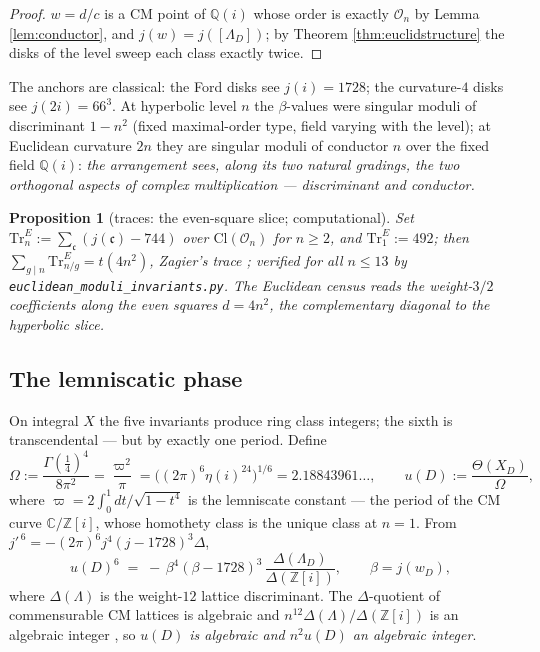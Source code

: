 \documentclass[11pt]{amsart}
\numberwithin{equation}{section}
\theoremstyle{plain}
\newtheorem{proposition}[theorem]{Proposition}
\theoremstyle{definition}
\theoremstyle{remark}
\newcommand{\C}{\mathbb{C}}
\newcommand{\Q}{\mathbb{Q}}
\newcommand{\Z}{\mathbb{Z}}
\newcommand{\Zi}{\Z[i]}
\newcommand{\Cl}{\mathrm{Cl}}
\newcommand{\idealc}{\mathfrak{c}}
\begin{document}
\begin{proof}
$w = d/c$ is a CM point of $\Q(i)$ whose order is exactly
$\mathcal{O}_n$ by Lemma \ref{lem:conductor}, and $j(w) =
j([\Lambda_D])$; by Theorem \ref{thm:euclidstructure} the disks of the
level sweep each class exactly twice.
\end{proof}

The anchors are classical: the Ford disks see $j(i) = 1728$; the
curvature-$4$ disks see $j(2i) = 66^3$.  At hyperbolic level $n$ the
$\beta$-values were singular moduli of discriminant $1 - n^2$ (fixed
maximal-order type, field varying with the level); at Euclidean
curvature $2n$ they are singular moduli of conductor $n$ over the
fixed field $\Q(i)$: \emph{the arrangement sees, along its two natural
gradings, the two orthogonal aspects of complex multiplication ---
discriminant and conductor.}

\begin{proposition}[traces: the even-square slice; computational]
\label{prop:euctraces}
Set $\mathrm{Tr}^E_n := \sum_{\idealc}(j(\idealc) - 744)$ over
$\Cl(\mathcal{O}_n)$ for $n \ge 2$, and $\mathrm{Tr}^E_1 := 492$; then
$\sum_{g \mid n}\mathrm{Tr}^E_{n/g} = t(4n^2)$, Zagier's trace
\cite{Zagier2002}; verified for all
$n \le 13$ by \texttt{euclidean\_\allowbreak moduli\_\allowbreak invariants.py}.  The Euclidean
census reads the weight-$3/2$ coefficients along the even squares
$d = 4n^2$, the complementary diagonal to the hyperbolic slice.
\end{proposition}

\subsection{The lemniscatic phase}\label{subsec:lemniscatic}

On integral $X$ the five invariants produce ring class integers; the
sixth is transcendental --- but by exactly one period.  Define
\[
  \Omega := \frac{\Gamma(\tfrac14)^4}{8\pi^2} = \frac{\varpi^2}{\pi}
  = \bigl((2\pi)^6\eta(i)^{24}\bigr)^{1/6} = 2.18843961\ldots,
  \qquad
  u(D) := \frac{\Theta(X_D)}{\Omega},
\]
where $\varpi = 2\int_0^1 dt/\sqrt{1 - t^4}$ is the lemniscate
constant --- the period of the CM curve $\C/\Zi$, whose homothety
class is the unique class at $n = 1$.  From $j'^{\,6} =
-(2\pi)^6j^4(j - 1728)^3\Delta$,
\begin{equation}\label{eq:u6}
  u(D)^6 \;=\; -\,\beta^4(\beta - 1728)^3\,
  \frac{\Delta(\Lambda_D)}{\Delta(\Zi)}, \qquad \beta = j(w_D),
\end{equation}
where $\Delta(\Lambda)$ is the weight-$12$ lattice discriminant.  The
$\Delta$-quotient of commensurable CM lattices is algebraic and
$n^{12}\Delta(\Lambda)/\Delta(\Zi)$ is an algebraic integer
\cite[Ch.~12]{Lang1987}, so \emph{$u(D)$ is algebraic and $n^2u(D)$ an
algebraic integer}.
\end{document}
